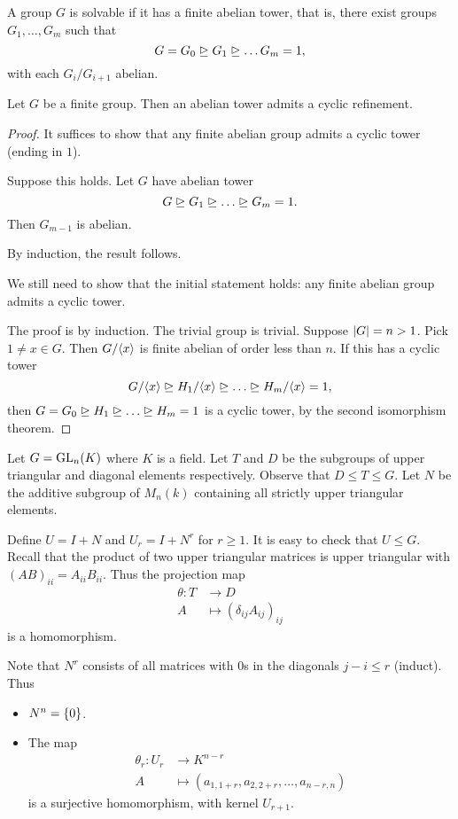 A group $G$ is solvable if it has a finite abelian tower, that is,
there exist groups $G_1, \dots, G_m$ such that \[
    G = G_0 \trianglerighteq G_1 \trianglerighteq \dots G_m = 1,
\] with each $G_i / G_{i+1}$ abelian.

\begin{proposition}
    Let $G$ be a finite group.
    Then an abelian tower admits a cyclic refinement.
\end{proposition}
\begin{proof}
    It suffices to show that any finite abelian group admits a cyclic
    tower (ending in $1$).

    Suppose this holds.
    Let $G$ have abelian tower \[
        G \nsup G_1 \nsup \dots \nsup G_m = 1.
    \] Then $G_{m-1}$ is abelian.

    By induction, the result follows.

    We still need to show that the initial statement holds: any finite
    abelian group admits a cyclic tower.

    The proof is by induction.
    The trivial group is trivial.
    Suppose $\lvert G\rvert = n > 1$.
    Pick $1 \ne x \in G$.
    Then $G/\langle x\rangle$ is finite abelian of order less than $n$.
    If this has a cyclic tower \[
        G/\angled x \nsup H_1 / \angled x
            \nsup \dots \nsup H_m / \angled x = 1,
    \]
    then $G = G_0 \nsup H_1 \nsup \dots \nsup H_m = 1$ is a cyclic
    tower, by the second isomorphism theorem.
\end{proof}

\begin{example}
    Let $G = \operatorname{GL}_n(K)$ where $K$ is a field.
    Let $T$ and $D$ be the subgroups of upper triangular and
    diagonal elements respectively.
    Observe that $D \le T \le G$.
    Let $N$ be the additive subgroup of $M_n(k)$ containing all strictly
    upper triangular elements.

    Define $U = I + N$ and $U_r = I + N^r$ for $r \ge 1$.
    It is easy to check that $U \le G$.
    Recall that the product of two upper triangular matrices is upper
    triangular with $(AB)_{ii} = A_{ii}B_{ii}$.
    Thus the projection map \begin{align*}
        \theta\colon T &\to D \\
        A &\mapsto {(\delta_{ij}A_{ij})}_{ij}
    \end{align*} is a homomorphism.

    Note that $N^r$ consists of all matrices with $0$s in the diagonals
    $j - i \le r$ (induct).
    Thus
    \begin{itemize}
        \item $N^n = \{0\}$.
        \item The map \begin{align*}
            \theta_r\colon U_r &\to K^{n-r} \\
            A &\mapsto (a_{1,1+r}, a_{2,2+r}, \dots, a_{n-r,n})
        \end{align*} is a surjective homomorphism,
        with kernel $U_{r+1}$.
    \end{itemize}
\end{example}

